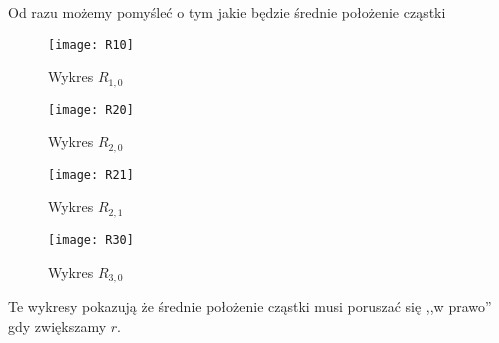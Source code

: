 Od razu możemy pomyśleć o tym jakie będzie średnie położenie cząstki
\begin{figure}[H]
	\centering
	\begin{minipage}[t]{0.47\textwidth}
		\centering
		\texttt{[image: R10]}
		\caption{Wykres $R_{1, 0}$}
		\label{fig:R10}
	\end{minipage}
	\hspace{0.04\textwidth}
	\begin{minipage}[t]{0.47\textwidth}
		\centering
		\texttt{[image: R20]}
		\caption{Wykres $R_{2, 0}$}
		\label{fig:R20}
	\end{minipage}
\end{figure}
\begin{figure}[H]
	\centering
	\begin{minipage}[t]{0.47\textwidth}
		\centering
		\texttt{[image: R21]}
		\caption{Wykres $R_{2, 1}$}
		\label{fig:R21}
	\end{minipage}
	\hspace{0.04\textwidth}
	\begin{minipage}[t]{0.47\textwidth}
		\centering
		\texttt{[image: R30]}
		\caption{Wykres $R_{3, 0}$}
		\label{fig:R30}
	\end{minipage}
\end{figure}
Te wykresy pokazują że średnie położenie cząstki musi poruszać się ,,w prawo'' gdy zwiększamy $r$.

